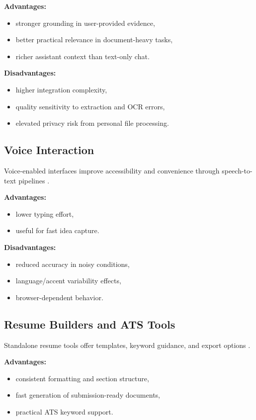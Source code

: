 \documentclass[conference]{IEEEtran}
\begin{document}
\textbf{Advantages:}
\begin{itemize}
    \item stronger grounding in user-provided evidence,
    \item better practical relevance in document-heavy tasks,
    \item richer assistant context than text-only chat.
\end{itemize}

\textbf{Disadvantages:}
\begin{itemize}
    \item higher integration complexity,
    \item quality sensitivity to extraction and OCR errors,
    \item elevated privacy risk from personal file processing.
\end{itemize}

\subsection{Voice Interaction}
Voice-enabled interfaces improve accessibility and convenience through speech-to-text pipelines \cite{w3c2023,pradhan2018}.

\textbf{Advantages:}
\begin{itemize}
    \item lower typing effort,
    \item useful for fast idea capture.
\end{itemize}

\textbf{Disadvantages:}
\begin{itemize}
    \item reduced accuracy in noisy conditions,
    \item language/accent variability effects,
    \item browser-dependent behavior.
\end{itemize}

\subsection{Resume Builders and ATS Tools}
Standalone resume tools offer templates, keyword guidance, and export options \cite{resumai2024,resumebuilder2024,atsllm2024}.

\textbf{Advantages:}
\begin{itemize}
    \item consistent formatting and section structure,
    \item fast generation of submission-ready documents,
    \item practical ATS keyword support.
\end{itemize}
\end{document}
